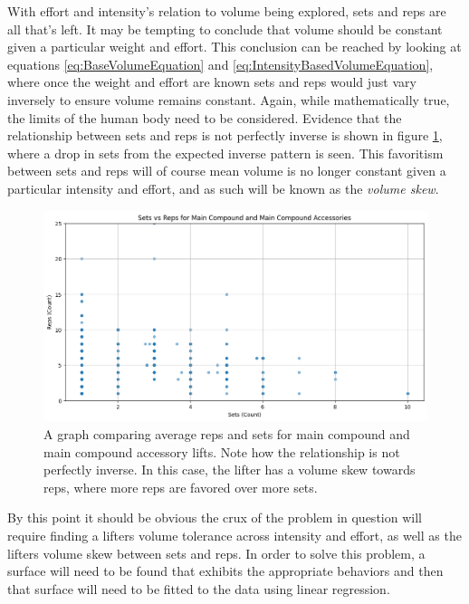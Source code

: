 With effort and intensity's relation to volume being explored, sets and reps are all that's left. It may be tempting to conclude that volume should be constant given a particular weight and effort. This conclusion can be reached by looking at equations \ref{eq:BaseVolumeEquation} and \ref{eq:IntensityBasedVolumeEquation}, where once the weight and effort are known sets and reps would just vary inversely to ensure volume remains constant. Again, while mathematically true, the limits of the human body need to be considered. Evidence that the relationship between sets and reps is not perfectly inverse is shown in figure \ref{fig:SetsVsReps}, where a drop in sets from the expected inverse pattern is seen. This favoritism between sets and reps will of course mean volume is no longer constant given a particular intensity and effort, and as such will be known as the \textit{volume skew}.

\begin{figure}[h]
    \centering
    \includegraphics[scale=0.55]{images/ch3/SetsVsReps.png}
    \caption{A graph comparing average reps and sets for main compound and main compound accessory lifts. Note how the relationship is not perfectly inverse. In this case, the lifter has a volume skew towards reps, where more reps are favored over more sets.}
    \label{fig:SetsVsReps}
\end{figure}

By this point it should be obvious the crux of the problem in question will require finding a lifters volume tolerance across intensity and effort, as well as the lifters volume skew between sets and reps. In order to solve this problem, a surface will need to be found that exhibits the appropriate behaviors and then that surface will need to be fitted to the data using linear regression.

